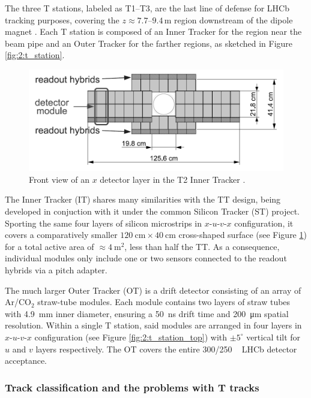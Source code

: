 The three T stations, labeled as T1--T3, are the last line of defense for LHCb tracking purposes, covering the $z \approx 7.7$--$9.4\,\si{\meter}$ region downstream of the dipole magnet \cite{Barbosa-Marinho:582793}.
Each T station is composed of an Inner Tracker for the region near the beam pipe and an Outer Tracker for the farther regions, as sketched in Figure \ref{fig:2:t_station}.

\begin{figure}[t]
	\centering
	\includegraphics[width=.6\textwidth]{graphics/02-lhcb/it_layout.png}
	\caption[Front view of an Inner Tracker $x$ layer.]{Front view of an $x$ detector layer in the T2 Inner Tracker \cite{Alves:1129809}.}
	\label{fig:2:IT}
\end{figure}

The Inner Tracker (IT) \cite{Barbosa-Marinho:582793} shares many similarities with the TT design, being developed in conjuction with it under the common Silicon Tracker (ST) project.
Sporting the same four layers of silicon microstrips in $x$-$u$-$v$-$x$ configuration, it covers a comparatively smaller $\SI{120}{\centi\meter} \times \SI{40}{\centi\meter}$ cross-shaped surface (see Figure \ref{fig:2:IT}) for a total active area of $\approx \SI{4}{\meter\squared}$, less than half the TT.
As a consequence, individual modules only include one or two sensors  connected to the readout hybrids via a pitch adapter.

The much larger Outer Tracker (OT) \cite{Barbosa-Marinho:519146} is a drift detector consisting of an array of Ar/CO$_2$ straw-tube modules.
Each module contains two layers of straw tubes with \SI{4.9}{\milli\meter} inner diameter, ensuring a \SI{50}{\nano\second} drift time and \SI{200}{\micro\meter} spatial resolution.
Within a single T station, said modules are arranged in four layers in $x$-$u$-$v$-$x$ configuration (see Figure \ref{fig:2:t_station_top}) with $\pm 5^\circ$ vertical tilt for $u$ and $v$ layers respectively.
The OT covers the entire 300/250 \si{\milli\rad} LHCb detector acceptance.

\subsubsection{Track classification and the problems with T tracks}

